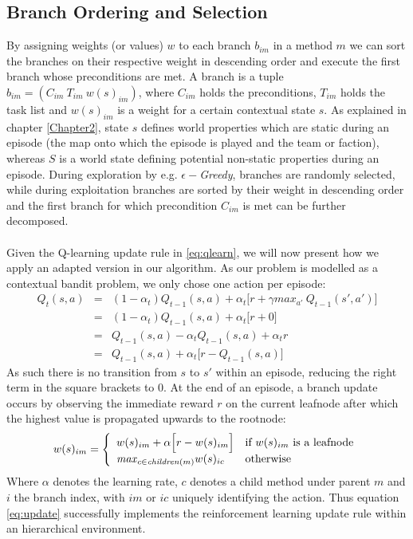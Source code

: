 \subsection{Branch Ordering and Selection}
By assigning weights (or values) $w$ to each branch $b_{im}$ in a method $m$ we
can sort the branches on their respective weight in descending order and execute
the first branch whose preconditions are met. A branch is a tuple $b_{im} =
(C_{im}~T_{im}~w(s)_{im})$, where $C_{im}$ holds the preconditions, $T_{im}$
holds the task list and $w(s)_{im}$ is a weight for a certain contextual state
$s$. As explained in chapter \ref{Chapter2}, state $s$ defines world properties
which are static during an episode (the map onto which the episode is played
and the team or faction), whereas $S$ is a world state defining potential
non-static properties during an episode. During exploration by e.g.
$\epsilon-$\emph{Greedy}, branches are randomly selected, while during
exploitation branches are sorted by their weight in descending order and the
first branch for which precondition $C_{im}$ is met can be further decomposed.
\\ \\
Given the Q-learning update rule in \ref{eq:qlearn}, we will now present how we
apply an adapted version in our algorithm. As our problem is modelled as a
contextual bandit problem, we only chose one action per episode:
\begin{eqnarray}
Q_t(s,a) & = & (1-\alpha_t)Q_{t-1}(s,a) + \alpha_t\Big[r + \gamma max_{a'}~Q_{t-1}(s',a')\Big] \\
         & = & (1-\alpha_t)Q_{t-1}(s,a) + \alpha_t\Big[r + 0\Big] \\
         & = & Q_{t-1}(s,a) - \alpha_t Q_{t-1}(s,a) + \alpha_t r \\
         & = & Q_{t-1}(s,a) + \alpha_t\Big[r - Q_{t-1}(s,a)\Big]
\end{eqnarray}
As such there is no transition from $s$ to $s'$ within an episode, reducing the
right term in the square brackets to $0$. At the end of an episode, a branch
update occurs by observing the immediate reward $r$ on the current leafnode
after which the highest value is propagated upwards to the rootnode:
\begin{equation}
w(s)_{im} = \left\{ \begin{array}{ll}
w(s)_{im} + \alpha\Big[r - w(s)_{im}\Big] & \textrm{if $w(s)_{im}$ is a leafnode}\\
\textrm{\emph{max}}_{c \in \textrm{\emph{children}}(m)} w(s)_{ic} & \textrm{otherwise}
\end{array} \right.
\label{eq:update}
\end{equation}
Where $\alpha$ denotes the learning rate, $c$ denotes a child method under
parent $m$ and $i$ the branch index, with $im$ or $ic$ uniquely identifying the
action. Thus equation \ref{eq:update} successfully implements the reinforcement
learning update rule within an hierarchical environment.

